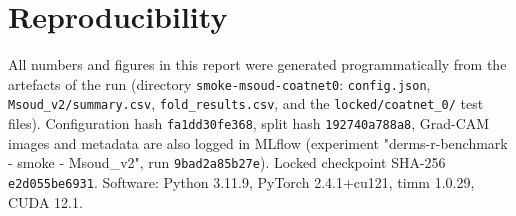 \documentclass[10pt,a4paper]{article}
\begin{document}
\section*{Reproducibility}
All numbers and figures in this report were generated programmatically from the artefacts of the run (directory \texttt{smoke-msoud-coatnet0}: \texttt{config.json}, \texttt{Msoud\_v2/summary.csv}, \texttt{fold\_results.csv}, and the \texttt{locked/coatnet\_0/} test files). Configuration hash \texttt{fa1dd30fe368}, split hash \texttt{192740a788a8}, Grad-CAM images and metadata are also logged in MLflow (experiment "derms-r-benchmark - smoke - Msoud\_v2", run \texttt{9bad2a85b27e}). Locked checkpoint SHA-256 \texttt{e2d055be6931}. Software: Python 3.11.9, PyTorch 2.4.1+cu121, timm 1.0.29, CUDA 12.1.
\end{document}
